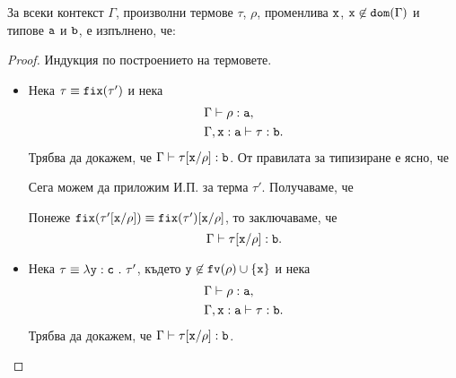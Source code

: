 \begin{proposition}
  За всеки контекст $\Gamma$, произволни термове $\tau$, $\rho$, променлива $\vv{x}$, $\vv{x} \not \in \vv{dom}(\Gamma)$ и типове $\vv{a}$ и $\vv{b}$, е изпълнено, че:
  \begin{prooftree}
  \end{prooftree}
\end{proposition}
\begin{proof}
  Индукция по построението на термовете.
  \begin{itemize}
  \item
    Нека $\tau \equiv \fix(\tau')$ и нека
    \begin{align*}
      & \Gamma \vdash \rho : \vv{a},\\
      & \Gamma, \type{x}{a} \vdash \tau : \vv{b}.
    \end{align*}
    Трябва да докажем, че $\Gamma \vdash \tau[\vv{x}/\rho] : \vv{b}$.
    От правилата за типизиране е ясно, че
    \begin{prooftree}
    \end{prooftree}
    Сега можем да приложим И.П. за терма $\tau'$. Получаваме, че
    \begin{prooftree}
    \end{prooftree}
    Понеже $\fix(\tau'\subst{x}{\rho}) \equiv \fix(\tau')\subst{x}{\rho}$, то заключаваме, че
    \[\Gamma \vdash \tau[\vv{x}/\rho] : \vv{b}.\]
  \item
    Нека $\tau \equiv \lamb{y}{c}{\tau'}$, където $\vv{y} \not\in \fv(\rho) \cup \{\vv{x}\}$
    и нека
    \begin{align*}
      & \Gamma \vdash \rho : \vv{a},\\
      & \Gamma, \type{x}{a} \vdash \tau : \vv{b}.
    \end{align*}
    Трябва да докажем, че $\Gamma \vdash \tau[\vv{x}/\rho] : \vv{b}$.
    

\end{itemize}
\end{proof}
